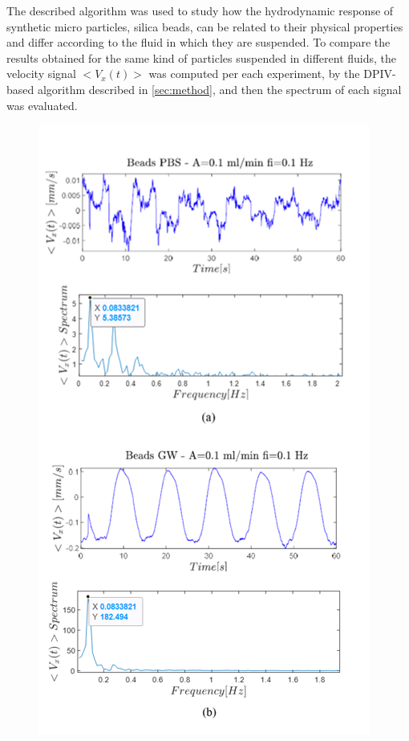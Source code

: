 \documentclass[journal]{IEEEtran}
\theoremstyle{definition}
\theoremstyle{remark}
\begin{document}
The described algorithm was used to study how the hydrodynamic response of synthetic micro particles, silica beads, can be related to their physical properties and differ according to the fluid in which they are suspended. To compare the results obtained for the same kind of particles suspended in different fluids, the velocity signal $<V_x(t)>$ was computed per each experiment, by the DPIV-based algorithm described in \sect\ref{sec:method}, and then the spectrum of each signal was evaluated. 


\begin{figure}[t]
	\centering
	\includegraphics[width=1\columnwidth]{images/Beads}

\end{figure}
\end{document}
